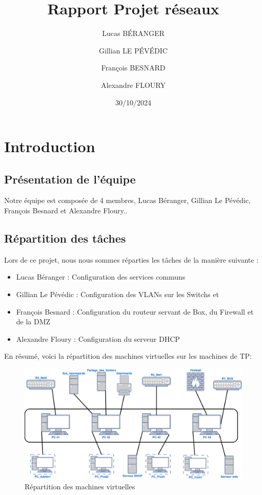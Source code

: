\documentclass[a4paper,12pt,openany]{report}
\title{Rapport Projet réseaux}
\author{
    Lucas BÉRANGER \and
    Gillian LE PÉVÉDIC \and
    François BESNARD \and
    Alexandre FLOURY \and
}
\date{30/10/2024}
\begin{document}
    \maketitle  
    \newpage

    \tableofcontents
    \newpage
    \listoffigures

    \chapter{Introduction}
        \section{Présentation de l'équipe}  
            Notre équipe est composée de 4 membres, Lucas Béranger, Gillian Le Pévédic, François Besnard et Alexandre Floury..

        \section{Répartition des tâches}
            Lors de ce projet, nous nous sommes réparties les tâches de la manière suivante :
            \begin{itemize}
                \item Lucas Béranger : Configuration des services communs
                \item Gillian Le Pévédic : Configuration des VLANs sur les Switchs et 
                \item François Besnard :  Configuration du routeur servant de Box, du Firewall et de la DMZ
                \item Alexandre Floury : Configuration du serveur DHCP
            \end{itemize}

            En résumé, voici la répartition des machines virtuelles sur les machines de TP:
            \begin{figure}
                \centering
                \includegraphics[width=1.2
                \textwidth]{Images/repartitions_machines.jpg}
                \caption{Répartition des machines virtuelles}
            \end{figure}
\end{document}
